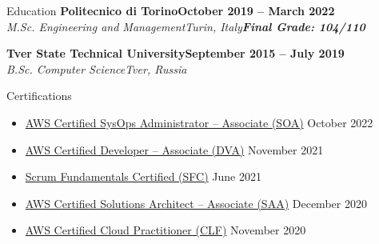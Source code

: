 \documentclass[a4paper]{article}
\newlength{\tabin}
\newlength{\secsep}
\newcommand{\lineunder}{\vspace*{-8pt}\\\hspace*{-6pt}\hrulefill\\\vspace*{-15pt}}
\newcommand{\education}[4]{\vspace{\secsep}\textbf{#1\hfill#2}\\\textit{#3\hfill#4}\vspace{2\secsep}}
\newcommand{\educationwithgrade}[5]{\vspace{\secsep}\textbf{#1\hfill#2}\\\textit{#3\hfill#4}\linebreak\textbf{\textit{#5}}\vspace{2\secsep}}
\newenvironment{tabbedsection}[1]{
  \begin{list}{}{
    \setlength{\itemsep}{0pt}
    \setlength{\labelsep}{0pt}
    \setlength{\labelwidth}{0pt}
    \setlength{\leftmargin}{\tabin}
    \setlength{\rightmargin}{\tabin}
    \setlength{\listparindent}{0pt}
    \setlength{\parsep}{0pt}
    \setlength{\parskip}{0pt}
    \setlength{\partopsep}{0pt}
    \setlength{\topsep}{#1}
  }
  \item[]
}{\end{list}}
\newenvironment{resume_section}[1]{
  \filbreak
  \vspace{2\secsep}
  \textsc{\large#1}
  \lineunder
  \begin{tabbedsection}{\secsep}
}{\end{tabbedsection}}
\newenvironment{subitems}{
  \renewcommand{\labelitemi}{-}
  \begin{itemize}
  \setlength{\labelsep}{1em}
}{\end{itemize}}
\begin{document}
\begin{resume_section}{Education}
  \educationwithgrade{Politecnico di Torino}{October 2019 -- March 2022}{M.Sc. Engineering and Management}{Turin, Italy}{Final Grade: 104/110}

  \education{Tver State Technical University}{September 2015 -- July 2019}{B.Sc. Computer Science}{Tver, Russia}
\end{resume_section}

\begin{resume_section}{Certifications}
  \begin{subitems}
    \item \href{https://www.credly.com/badges/849a2bb2-2a38-46ad-9352-613da643d83a}{AWS Certified SysOps Administrator -- Associate (SOA)} \hfill October 2022
    \item \href{https://www.credly.com/badges/4af15df4-f5b2-4d6b-b989-bb47e71c9986}{AWS Certified Developer -- Associate (DVA)} \hfill November 2021
    \item \href{https://www.scrumstudy.com/certification/verify?type=SFC&number=848920}{Scrum Fundamentals Certified (SFC)} \hfill June 2021
    \item \href{https://www.credly.com/badges/52a6f0ff-d46a-4d42-9bb1-ea2b7fb01526}{AWS Certified Solutions Architect -- Associate (SAA)} \hfill December 2020
    \item \href{https://www.credly.com/badges/488ba1a8-a95a-46f5-943b-c275bc7e6178}{AWS Certified Cloud Practitioner (CLF)} \hfill November 2020
  \end{subitems}
\end{resume_section}
\end{document}
